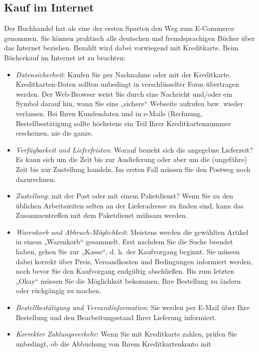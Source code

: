 \documentclass[]{book}
\providecommand{\tightlist}{%
  \setlength{\itemsep}{0pt}\setlength{\parskip}{0pt}}
\theoremstyle{definition}
\theoremstyle{definition}
\theoremstyle{definition}
\theoremstyle{remark}
\begin{document}
\subsection{Kauf im Internet}\label{kauf-im-internet}

Der Buchhandel hat als eine der ersten Sparten den Weg zum E-Commerce
genommen. Sie können praktisch alle deutschen und fremdsprachigen Bücher
über das Internet beziehen. Bezahlt wird dabei vorwiegend mit
Kreditkarte. Beim Bücherkauf im Internet ist zu beachten:

\begin{itemize}
\tightlist
\item
  \emph{Datensicherheit}: Kaufen Sie per Nachnahme oder mit der
  Kreditkarte. Kreditkarten-Daten sollten unbedingt in verschlüsselter
  Form übertragen werden. Der Web-Browser weist Sie durch eine Nachricht
  und/oder ein Symbol darauf hin, wann Sie eine „sichere`` Webseite
  aufrufen bzw. wieder verlassen. Bei Ihren Kundendaten und in e-Mails
  (Rechnung, Bestellbestätigung sollte höchstens ein Teil Ihrer
  Kreditkartennummer erscheinen, nie die ganze.
\item
  \emph{Verfügbarkeit und Lieferfristen}: Worauf bezieht sich die
  angegebne Lieferzeit? Es kann sich um die Zeit bis zur Auslieferung
  oder aber um die (ungefähre) Zeit bis zur Zustellung handeln. Im
  ersten Fall müssen Sie den Postweg noch dazurechnen.
\item
  \emph{Zustellung}: mit der Post oder mit einem Paketdienst? Wenn Sie
  zu den üblichen Arbeitszeiten selten an der Lieferadresse zu finden
  sind, kann das Zusammentreffen mit dem Paketdienst mühsam werden.
\item
  \emph{Warenkorb und Abbruch-Möglichkeit}: Meistens werden die
  gewählten Artikel in einem „Warenkorb`` gesammelt. Erst nachdem Sie
  die Suche beendet haben, gehen Sie zur „Kasse``, d. h. der Kaufvorgang
  beginnt. Sie müssen dabei korrekt über Preis, Versandkosten und
  Bedingungen informiert werden, noch bevor Sie den Kaufvorgang
  endgültig abschließen. Bis zum letzten „Okay`` müssen Sie die
  Möglichkeit bekommen, Ihre Bestellung zu ändern oder rückgängig zu
  machen.
\item
  \emph{Bestellbestätigung und Versandinformation}: Sie werden per
  E-Mail über Ihre Bestellung und den Bearbeitungsstand Ihrer Lieferung
  informiert.
\item
  \emph{Korrekter Zahlungsverkehr}: Wenn Sie mit Kreditkarte zahlen,
  prüfen Sie unbedingt, ob die Abbuchung von Ihrem Kreditkartenkonto mit

\end{itemize}
\end{document}
